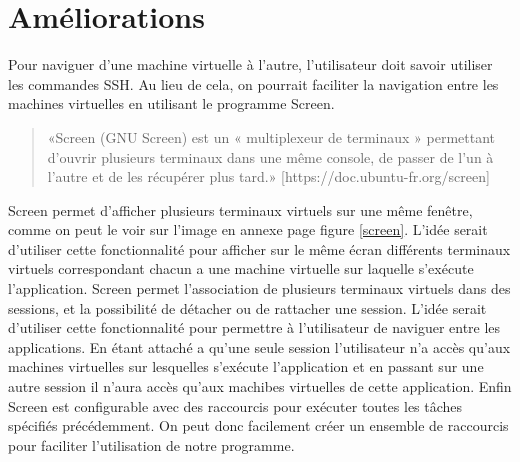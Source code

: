\documentclass{report}
\begin{document}
    \section{Améliorations}

    Pour naviguer d'une machine virtuelle à l'autre, l'utilisateur doit savoir utiliser les commandes SSH.
    Au lieu de cela, on pourrait faciliter la navigation entre les machines virtuelles en utilisant le programme Screen.
    \begin{quote}
        «Screen (GNU Screen) est un « multiplexeur de terminaux » permettant d'ouvrir plusieurs terminaux dans une même console, de passer de l'un à l'autre et de les récupérer plus tard.»
        [https://doc.ubuntu-fr.org/screen]
    \end{quote}
    Screen permet d'afficher plusieurs terminaux virtuels sur une même fenêtre, comme on peut le voir sur l'image en annexe page \pageref{screen} figure \ref{screen}.
    L'idée serait d'utiliser cette fonctionnalité pour afficher sur le même écran différents terminaux virtuels correspondant chacun a une machine virtuelle sur laquelle s'exécute l'application.
    Screen permet l'association de plusieurs terminaux virtuels dans des sessions, et la possibilité de détacher ou de rattacher une session.
    L'idée serait d'utiliser cette fonctionnalité pour permettre à l'utilisateur de naviguer entre les applications. En étant attaché a qu'une seule session l'utilisateur n'a accès qu'aux machines virtuelles sur lesquelles s'exécute l'application et en passant  sur une autre session il n'aura accès qu'aux machibes virtuelles de cette application.
    Enfin Screen est configurable avec des raccourcis pour exécuter toutes les tâches spécifiés précédemment. On peut donc facilement créer un ensemble de raccourcis pour faciliter l'utilisation de notre programme.\bigbreak 
    
\end{document}

